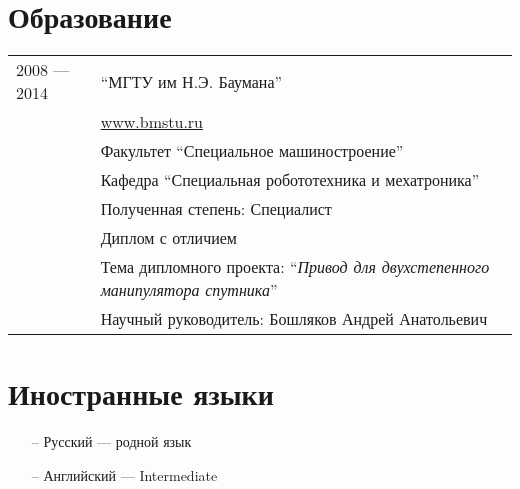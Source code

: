 \documentclass[a4paper, 10pt]{article}
\begin{document}
\section{Образование}
\begin{longtable}{p{20mm}|p{140mm}}
2008 --- 2014
& ``МГТУ им Н.Э. Баумана'' \\
& \href{http://www.bmstu.ru}{www.bmstu.ru} \\
& Факультет ``Специальное машиностроение'' \\
& Кафедра ``Специальная робототехника и мехатроника'' \\
& Полученная степень: Специалист \\
& Диплом с отличием \\
& Тема дипломного проекта: ``\textit{Привод для двухстепенного манипулятора спутника}'' \\
& Научный руководитель: Бошляков Андрей Анатольевич \\
\end{longtable}


\section{Иностранные языки}
\begin{itemize}
    \item[--] Русский    --- родной язык
    \item[--] Английский --- Intermediate
\end{itemize}
\end{document}
